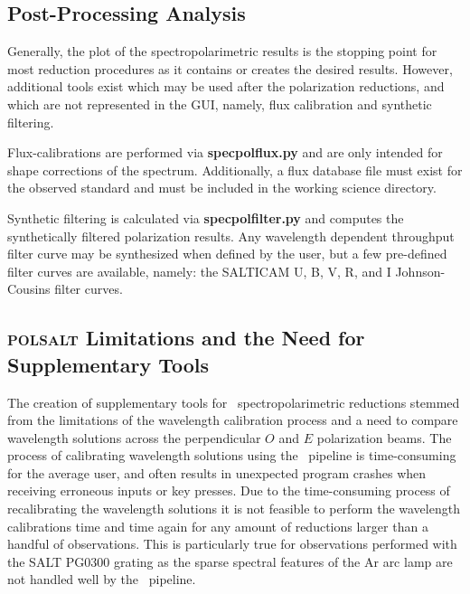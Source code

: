 \subsection{Post-Processing Analysis}

Generally, the plot of the spectropolarimetric results is the stopping point for most reduction procedures as it contains or creates the desired results. However, additional tools exist which may be used after the polarization reductions, and which are not represented in the \gls{GUI}, namely, flux calibration and synthetic filtering.

Flux-calibrations are performed via \textbf{specpolflux.py} and are only intended for shape corrections of the spectrum. Additionally, a flux database file must exist for the observed standard and must be included in the working science directory.

Synthetic filtering is calculated via \textbf{specpolfilter.py} and computes the synthetically filtered polarization results.
Any wavelength dependent throughput filter curve may be synthesized when defined by the user, but a few pre-defined filter curves are available, namely: the \gls{SALTICAM} \gls{U}, \gls{B}, \gls{V}, \gls{R}, and \gls{I} Johnson-Cousins filter curves.

\subsection{\textsc{polsalt} Limitations and the Need for Supplementary Tools} \label{subsec:polsalt_limits}

The creation of supplementary tools for \polsalt\ spectropolarimetric reductions stemmed from the limitations of the wavelength calibration process and a need to compare wavelength solutions across the perpendicular $O$ and $E$ polarization beams. The process of calibrating wavelength solutions using the \polsalt\ pipeline is time-consuming for the average user, and often results in unexpected program crashes when receiving erroneous inputs or key presses. Due to the time-consuming process of recalibrating the wavelength solutions it is not feasible to perform the wavelength calibrations time and time again for any amount of reductions larger than a handful of observations. This is particularly true for observations performed with the \gls{SALT} PG$0300$ grating as the sparse spectral features of the \gls{Ar} arc lamp are not handled well by the \polsalt\ pipeline.

